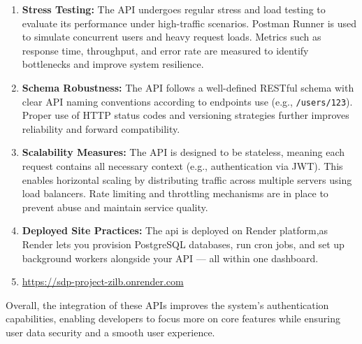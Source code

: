\begin{enumerate}
    \item \textbf{Stress Testing:} 
    The API undergoes regular stress and load testing to evaluate its performance under high-traffic scenarios. Postman Runner is used to simulate concurrent users and heavy request loads. Metrics such as response time, throughput, and error rate are measured to identify bottlenecks and improve system resilience.

    \item \textbf{Schema Robustness:} 
    The API follows a well-defined RESTful schema with clear API naming conventions according to endpoints use (e.g., \texttt{/users/123}). Proper use of HTTP status codes and versioning strategies further improves reliability and forward compatibility.

    \item \textbf{Scalability Measures:} 
    The API is designed to be stateless, meaning each request contains all necessary context (e.g., authentication via JWT). This enables horizontal scaling by distributing traffic across multiple servers using load balancers. Rate limiting and throttling mechanisms are in place to prevent abuse and maintain service quality.

    \item \textbf{Deployed Site Practices:} 
    The api is deployed on Render platform,as Render lets you provision PostgreSQL databases, run cron jobs, and set up background workers alongside your API — all within one dashboard.
    \item \url{https://sdp-project-zilb.onrender.com}
\end{enumerate}


Overall, the integration of these APIs improves the system’s authentication capabilities, enabling developers to focus more on core features while ensuring user data security and a smooth user experience.

